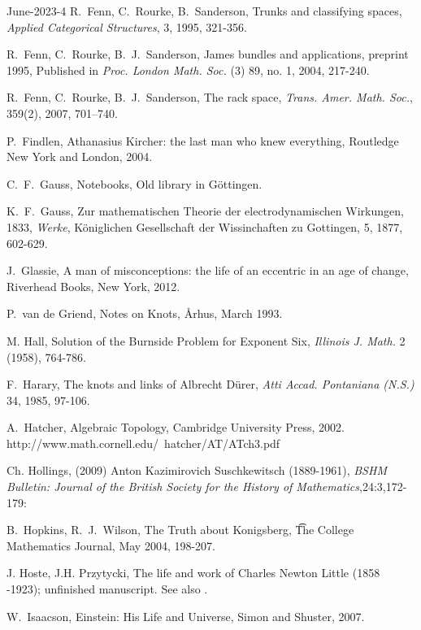 \documentclass[12pt]{amsart}
\begin{document}
\begin{thebibliography}{June-2023-4}
R.~Fenn, C.~Rourke, B.~Sanderson, Trunks and classifying spaces,
{\it Applied Categorical Structures}, 3, 1995, 321-356.

R.~Fenn, C.~Rourke, B.~J.~Sanderson, James bundles and applications,
preprint 1995,
Published in {\it Proc. London Math. Soc.} (3) 89, no. 1, 2004, 217-240.

R.~Fenn, C.~Rourke, B.~J.~Sanderson, The rack space, {\it Trans. Amer. Math. Soc.}, 359(2), 2007, 701–740.

P.~Findlen, Athanasius Kircher: the last man who knew everything, Routledge New York and London, 2004.

C.~F.~Gauss, Notebooks, Old library in G\"ottingen.

K.~F.~Gauss, Zur mathematischen Theorie der electrodynamischen  Wirkungen,
1833, {\it Werke}, K\"oniglichen Gesellschaft der Wissinchaften zu Gottingen,
5, 1877, 602-629.

J.~Glassie, A man of misconceptions: the life of an eccentric in an age of change,
Riverhead Books, New York, 2012.

P.~van de Griend, Notes on Knots, {\AA}rhus, March 1993.

 M. Hall, Solution of the Burnside Problem for
Exponent Six, \textit{Illinois J. Math.} 2 (1958), 764-786.

F.~Harary, The knots and links of Albrecht D\"urer, {\it Atti Accad.
Pontaniana (N.S.)} 34, 1985, 97-106.

A.~Hatcher, Algebraic Topology, Cambridge University Press, 2002.\\
http://www.math.cornell.edu/~hatcher/AT/ATch3.pdf

 Ch. Hollings, (2009) Anton Kazimirovich Suschkewitsch (1889-1961), {\it BSHM Bulletin: Journal of the British
Society for the History of Mathematics},24:3,172-179:

B.~Hopkins, R.~J.~Wilson, The Truth about Konigsberg,
{\t The College Mathematics Journal}, May 2004, 198-207.

 J. Hoste, J.H. Przytycki, The life and work of Charles Newton Little (1858 -1923); unfinished manuscript. See also \cite{Lit}.

W.~Isaacson, Einstein: His Life and Universe, Simon and Shuster, 2007.


\end{thebibliography}
\end{document}
